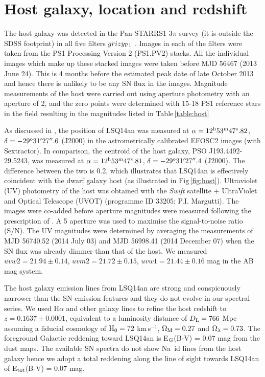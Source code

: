 \documentclass[useAMS,usenatbib]{mn2e}
\def\kms{km\,s$^{-1}$}
\def\an{LSQ14an}
\begin{document}
\section{Host galaxy, location and redshift}\label{sec:host}

The host galaxy was detected in the Pan-STARRS1 3$\pi$ survey (it is outside the SDSS
footprint) in all five filters $grizy_{\rm P1}$ \citep[see][for a description of the filter set]{2012ApJ...750...99T}. 
Images in each of the filters were taken from the PS1 Processing
Version 2 (PS1.PV2) stacks. All the individual images which make up
these stacked images were taken
before MJD 56467 (2013 June 24). This is 4 months before the estimated
peak date of late October 2013 and hence there is unlikely to be
any SN flux in the images. Magnitude measurements of the host were carried
out using aperture photometry with an aperture of 2\arcsec, and the
zero points were determined with 15-18 PS1 reference stars 
\citep{2012ApJ...756..158S,2013ApJS..205...20M}
in the field resulting in the magnitudes listed in Table\,\ref{table:host}

As discussed in \cite{je16}, the position of LSQ14an was measured at
 $\alpha = 12^{\rm h}53^{\rm m}47^{\rm s}.82$, $\delta = -29^{\rm o}31'27''.6$ (J2000) 
in the astrometrically calibrated EFOSC2 images (with Sextractor). In comparison, the centroid of the host galaxy,
PSO J193.4492-29.5243, was measured at
 $\alpha = 12^{\rm h}53^{\rm m}47^{\rm s}.81$, $\delta = -29^{\rm o}31'27''.4$ (J2000). The difference between the two is
0.2\arcsec, which illustrates that LSQ14an is effectively coincident with the
dwarf galaxy host (as illustrated in Fig\,\ref{fig:host}). 
Ultraviolet (UV) photometry of the host was obtained with the {\it Swift} satellite + UltraViolet and Optical Telescope (UVOT) (programme ID 33205; P.I. Margutti). 
The  images  were co-added before aperture magnitudes were measured following the prescription of \citet{po08}.  A 5\arcsec\/ aperture was used to maximise the signal-to-noise ratio (S/N).  The UV magnitudes were determined by averaging the measurements of MJD 56740.52 (2014 July 03) and MJD 56998.41 (2014 December 07) when the SN flux was already dimmer than that of the host. We measured $uvw2 = 21.94 \pm0.14$, $uvm2 = 21.72 \pm0.15$, $uvw1 = 21.44 \pm0.16$ mag in the AB mag system. 

The host galaxy emission lines from LSQ14an are strong and conspicuously narrower than the SN emission features and they do not evolve in our spectral series. We used H$\alpha$ and other galaxy lines to refine the host redshift to 
$z=0.1637\pm0.0001$, equivalent to a luminosity distance of $D_{\rm L}=766$ Mpc assuming a fiducial cosmology of ${\rm H}_{0}=72$ \kms\/, ${\rm \Omega_{M}}=0.27$ and ${\rm \Omega_{\lambda}}=0.73$.
The foreground Galactic reddening toward \an\/ is E$_{\rm G}$(B-V) = 0.07 mag from the \cite{sf11} dust maps.
The available SN spectra do not show Na~{\sc id} lines from the host galaxy hence we adopt a total reddening along the line of sight towards \an\/ of E$_{\rm tot}$(B-V) = 0.07 mag.
\end{document}
